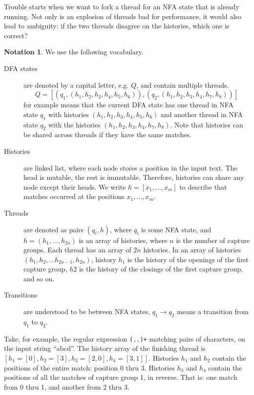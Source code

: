 \documentclass[english]{sigplanconf}
\theoremstyle{definition}
\newtheorem*{notation}{Notation}
\begin{document}
Trouble starts when we want to fork a thread for an NFA state that
is already running. Not only is an explosion of threads bad for
performance, it would also lead to ambiguity: if the two threads
disagree on the histories, which one is correct?

\begin{notation}

We use the following vocabulary.

\begin{description}
\item[DFA states] are denoted by a capital letter, e.g. $Q$, and
	contain multiple threads.  \[Q=[(q_1, (h_1, h_2, h_3, h_4, h_5, h_6)),
	(q_2, (h_1, h_2, h_3, h_4, h_7, h_8))]\] for example means
	that the current DFA state has one thread in NFA state $q_1$ with
	histories $(h_1, h_2, h_3, h_4, h_5, h_6)$ and another thread in NFA state
	$q_2$ with the histories $(h_1, h_2, h_3, h_4, h_7, h_8)$.
	Note that histories can be shared across threads if they
	have the same matches.
\item[Histories] are linked list, where each node stores a position in the input text.
	The head is mutable, the rest is immutable. Therefore, histories can share any node
	except their heads. We write $h=[x_1, \dots, x_m]$ to describe that matches occurred
	at the positions $x_1, \dots, x_m$. 
\item[Threads] are denoted as pairs $(q_i, h)$, where $q_i$ is some
	NFA state, and $h = (h_1, \dots, h_{2n})$ is an array of histories,
	where $n$ is the number of capture groups.  Each thread has an array
	of $2n$ histories. In an array of histories $(h_1, h_2, \dots
	h_{2n-1}, h_{2n})$, history $h_1$ is the history of the openings
	of the first capture group, $h2$ is the history of the closings of
	the first capture group, and so on.
\item[Transitions] are  understood to be between NFA states,
	$q_1\rightarrow q_2$ means a transition from $q_1$ to $q_2$.
\end{description}

Take, for example, the regular expression \texttt{(..)+} matching
pairs of characters, on the input string ``abcd''. The history array of the
finishing thread  is $[h_1=[0], h_2=[3], h_3=[2,0], h_4=[3,1]]$.
Histories $h_1$ and $h_2$ contain the positions of the entire match: position 0 thru 3.
Histories $h_3$ and $h_4$ contain the positions of all the matches of capture group 1, in reverse. That is:
one match from 0 thru 1, and another from 2 thru 3.


\end{notation}
\end{document}
